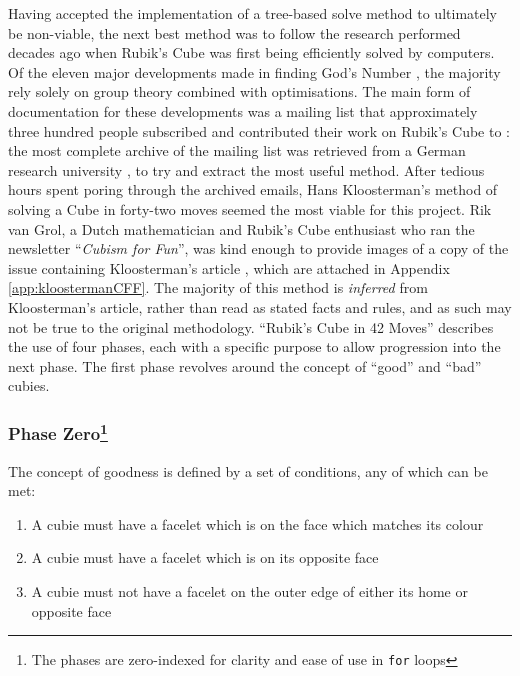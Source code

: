 \documentclass{report}
\newcommand{\tit}[1]{\textit{#1}}
\newcommand{\propernoun}[1]{\enquote{\tit{#1}}}
\begin{document}
	Having accepted the implementation of a tree-based solve method to ultimately be non-viable, the next best method was to follow the research performed decades ago when Rubik's Cube was first being efficiently solved by computers. Of the eleven major developments made in finding God's Number \cite{Rokicki2010}, the majority rely solely on group theory combined with optimisations. The main form of documentation for these developments was a mailing list that approximately three hundred people subscribed and contributed their work on Rubik's Cube to \cite{Schoenert1996}: the most complete archive of the mailing list was retrieved from a German research university \cite{Schoenert1996}, \cite{RWTHAachenUniversity} to try and extract the most useful method. After tedious hours spent poring through the archived emails, Hans Kloosterman's method of solving a Cube in forty-two moves seemed the most viable for this project. Rik van Grol, a Dutch mathematician and Rubik's Cube enthusiast who ran the newsletter \propernoun{Cubism for Fun}, was kind enough to provide images of a copy of the issue containing Kloosterman's article \cite{Kloosterman1990}, which are attached in Appendix \ref{app:kloostermanCFF}.	The majority of this method is \tit{inferred} from Kloosterman's article, rather than read as stated facts and rules, and as such may not be true to the original methodology. \enquote{Rubik's Cube in 42 Moves} describes the use of four phases, each with a specific purpose to allow progression into the next phase. The first phase revolves around the concept of \enquote{good} and \enquote{bad} cubies. 
	
	\subsubsection[Phase Zero]{Phase Zero\protect\footnote{The phases are zero-indexed for clarity and ease of use in \lstinline|for| loops}}
	
	The concept of goodness is defined by a set of conditions, any of which can be met:
	
	\begin{enumerate}
		\item A cubie must have a facelet which is on the face which matches its colour
		\item A cubie must have a facelet which is on its opposite face
		\item A cubie must not have a facelet on the outer edge of either its home or opposite face
	\end{enumerate}
\end{document}
